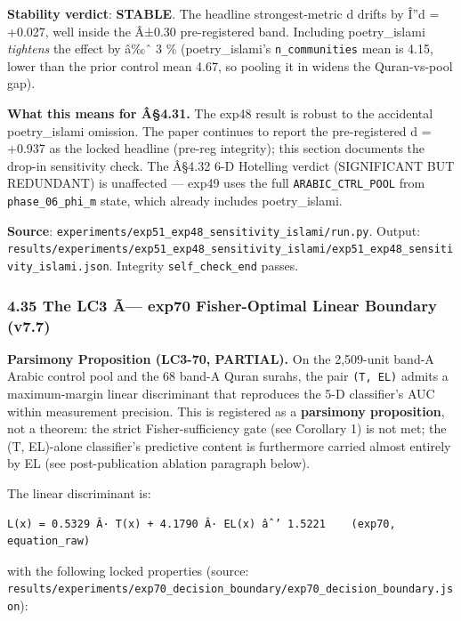 \documentclass[
]{article}
\begin{document}
\textbf{Stability verdict}: \textbf{STABLE}. The headline
strongest-metric d drifts by Î''d = +0.027, well inside the Â±0.30
pre-registered band. Including poetry\_islami \emph{tightens} the effect
by â‰ˆ 3 \% (poetry\_islami's \texttt{n\_communities} mean is 4.15,
lower than the prior control mean 4.67, so pooling it in widens the
Quran-vs-pool gap).

\textbf{What this means for Â§4.31.} The exp48 result is robust to the
accidental poetry\_islami omission. The paper continues to report the
pre-registered d = +0.937 as the locked headline (pre-reg integrity);
this section documents the drop-in sensitivity check. The Â§4.32 6-D
Hotelling verdict (SIGNIFICANT BUT REDUNDANT) is unaffected --- exp49
uses the full \texttt{ARABIC\_CTRL\_POOL} from
\texttt{phase\_06\_phi\_m} state, which already includes poetry\_islami.

\textbf{Source}:
\texttt{experiments/exp51\_exp48\_sensitivity\_islami/run.py}. Output:
\texttt{results/experiments/exp51\_exp48\_sensitivity\_islami/exp51\_exp48\_sensitivity\_islami.json}.
Integrity \texttt{self\_check\_end} passes.

\subsubsection{4.35 The LC3 Ã--- exp70 Fisher-Optimal Linear Boundary
(v7.7)}\label{the-lc3-uxe3-exp70-fisher-optimal-linear-boundary-v7.7}

\textbf{Parsimony Proposition (LC3-70, PARTIAL).} On the 2,509-unit
band-A Arabic control pool and the 68 band-A Quran surahs, the pair
\texttt{(T,\ EL)} admits a maximum-margin linear discriminant that
reproduces the 5-D classifier's AUC within measurement precision. This
is registered as a \textbf{parsimony proposition}, not a theorem: the
strict Fisher-sufficiency gate (see Corollary 1) is not met; the (T,
EL)-alone classifier's predictive content is furthermore carried almost
entirely by EL (see post-publication ablation paragraph below).

The linear discriminant is:

\begin{verbatim}
L(x) = 0.5329 Â· T(x) + 4.1790 Â· EL(x) âˆ’ 1.5221    (exp70, equation_raw)
\end{verbatim}

with the following locked properties (source:
\texttt{results/experiments/exp70\_decision\_boundary/exp70\_decision\_boundary.json}):
\end{document}
